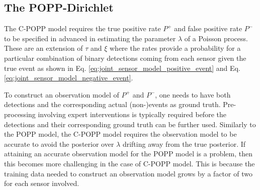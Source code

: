 
\subsection{The POPP-Dirichlet}
\label{subsec:popd}

The C-POPP model requires the true positive rate $P^+$ and false positive rate $P^-$ to be specified in advanced in estimating the parameter $\lambda$ of a Poisson process. These are an extension of $\tau$ and $\xi$ where the rates provide a probability for a particular combination of binary detections coming from each sensor given the true event as shown in Eq. \ref{eq:joint_sensor_model_positive_event} and Eq. \ref{eq:joint_sensor_model_negative_event}.

To construct an observation model of $P^+$ and $P^-$, one needs to have both detections and the corresponding actual (non-)events as ground truth. Pre-processing involving expert interventions is typically required before the detections and their corresponding ground truth can be further used. Similarly to the POPP model, the C-POPP model requires the observation model to be accurate to avoid the posterior over $\lambda$ drifting away from the true posterior. If attaining an accurate observation model for the POPP model is a problem, then this becomes more challenging in the case of C-POPP model. This is because the training data needed to construct an observation model grows by a factor of two for each sensor involved.       

